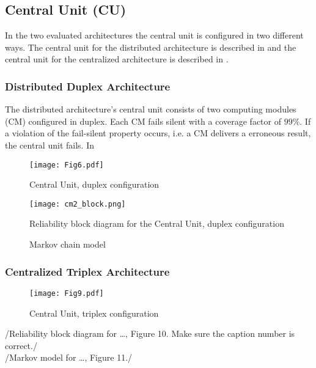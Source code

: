 \subsection{Central Unit (CU)}
In the two evaluated architectures the central unit is configured in two different ways. The central unit for the distributed architecture is described in  and the central unit for the centralized architecture is described in . 

\subsubsection{Distributed Duplex Architecture}
\label{subsec:dda}
The distributed architecture's central unit consists of two computing modules (CM) configured in duplex. Each CM fails silent with a coverage factor of $99\%$. If a violation of the fail-silent property occurs, i.e. a CM delivers a erroneous result, the central unit fails. In 

\begin{figure}
  \centering
  \texttt{[image: Fig6.pdf]}
  \caption{Central Unit, duplex configuration }
  \label{fig6}
\end{figure}
\begin{figure}[H]
  \centering
  \texttt{[image: cm2\_block.png]}
  \caption{Reliability block diagram for the Central Unit, duplex configuration}
  \label{fig7}
\end{figure}
\begin{figure}[h!]
  \begin{center}
  \caption{Markov chain model}
\end{center}
\end{figure}
\subsubsection{Centralized Triplex Architecture}
\label{subsec:cta}
\begin{figure}[H]
  \centering
  \texttt{[image: Fig9.pdf]}
  \caption{Central Unit, triplex configuration }
  \label{fig9}
\end{figure}
/{Reliability block diagram for …, Figure 10.  Make sure the caption number is correct.}/
\\/{Markov model for …, Figure 11.}/

